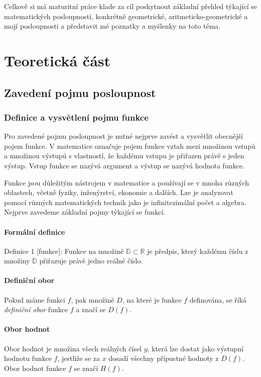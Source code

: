 \documentclass[12pt]{report}			%
\begin{document}
Celkově si má maturitní práce klade za cíl poskytnout základní přehled týkající se matematických posloupností, konkrétně geometrické, aritmeticko-geometrické a mojí posloupnosti a představit mé poznatky a myšlenky na toto téma.

	
	
	\part{Teoretická část}
	
		\chapter{Zavedení pojmu posloupnost}
		
			
			\section{Definice a vysvětlení pojmu funkce}
Pro zavedené pojmu posloupnost je nutné nejprve zavést a vysvětlit obecnější pojem funkce. V matematice označuje pojem funkce vztah mezi množinou vstupů a množinou výstupů s vlastností, že každému vstupu je přiřazen právě s jeden výstup. Vstup funkce se nazývá argument a výstup se nazývá hodnota funkce.

Funkce jsou důležitým nástrojem v matematice a používají se v mnoha různých oblastech, včetně fyziky, inženýrství, ekonomie a dalších. Lze je analyzovat pomocí různých matematických technik jako je infinitezimální počet a algebra. Nejprve zavedeme základní pojmy týkající se funkcí.


				\subsection{Formální definice}
Definice 1 [funkce]: Funkce na množině $\mathbb{D} \subset \mathbb{R}$ je předpis, který každému číslu z množiny  $\mathbb{D}$ přiřazuje právě jedno reálné číslo.

				\subsection{Definiční obor}
Pokud máme funkci $f$, pak množině $D$, na které je funkce $f$ definována, se říká \emph{definiční obor} funkce $f$ a značí se $D(f)$.
				\subsection{Obor hodnot}
Obor hodnot je množina všech reálných čísel $y$, která lze dostat jako výstupní hodnotu funkce $f$, jestliže se za $x$ dosadí všechny přípustné hodnoty z $D(f)$. Obor hodnot funkce $f$ se značí $H(f)$.
\end{document}

